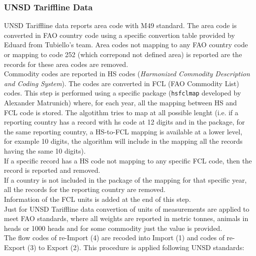 \documentclass[nojss]{jss}\usepackage[]{graphicx}\usepackage[]{color}
\begin{document}
\subsubsection{UNSD Tariffline Data}
UNSD Tariffline data reports area code with M49 standard. The area code is converted in FAO country code using a specific convertion table provided by Eduard from Tubiello's team. Area codes not mapping to any FAO country code or mapping to code 252 (which correpond not defined area) is reported are the records for these area codes are removed.\\
Commodity codes are reported in HS codes ({\it Harmonized Commodity Description and Coding System}). The codes are converted in FCL (FAO Commodity List) codes. This step is performed using a specific package ({\tt hsfclmap} developed by Alexander Matrunich) where, for each year, all the mapping between HS and FCL code is stored. The algotithm tries to map at all possible lenght (i.e. if a reporting country has a record with hs code at 12 digits and in the package, for the same reporting country, a HS-to-FCL mapping is available at a lower level, for example 10 digits, the algorithm will include in the mapping all the records having the same 10 digits).\\
If a specific record has a HS code not mapping to any specific FCL code, then the record is reported and removed.\\
If a country is not included in the package of the mapping for that specific year, all the records for the reporting country are removed.\\
Information of the FCL units is added at the end of this step.\\
Just for UNSD Tariffline data convertion of units of measurements are applied to meet FAO standards, where all weights are reported in metric tonnes, animals in heads or 1000 heads and for some commodity just the value is provided.\\
The flow codes of re-Import (4) are recoded into Import (1) and codes of re-Export (3) to Export (2). This procedure is applied following UNSD standards:
\end{document}
